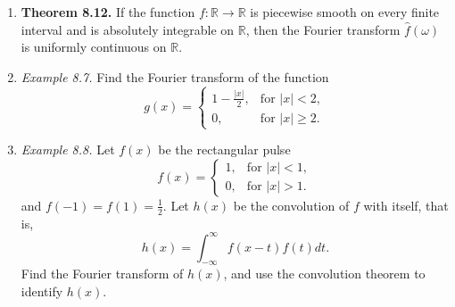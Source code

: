 \begin{enumerate}
\item \textbf{Theorem 8.12.} If the function $f : \mathbb{R} \to \mathbb{R}$ is piecewise smooth on every
finite interval and is absolutely integrable on $\mathbb{R}$, then the Fourier transform $\widehat{f}(\omega)$ is uniformly continuous on $\mathbb{R}$.


\item \textit{Example 8.7.} Find the Fourier transform of the function
\[ g(x)=
\begin{cases}
    \displaystyle 1 - \frac{|x|}{2}, & \text{for } |x|<2,\\
    0, & \text{for } |x|\geq 2.
\end{cases}\]

    \newpage 
    \item \textit{Example 8.8.}
    Let $f(x)$ be the rectangular pulse
    \[ f(x)=
    \begin{cases}
        1, & \text{for } |x| < 1,\\
        0, & \text{for } |x| > 1.
    \end{cases}\]
    and $f (-1) = f (1) = \frac{1}{2}$. Let $h(x)$ be the convolution of $f$ with itself, that is,
    \[h(x)=\int_{-\infty}^{\infty} f(x-t) f(t) dt.\]
    Find the Fourier transform of $h(x)$, and use the convolution theorem to identify $h(x)$.


\end{enumerate}

